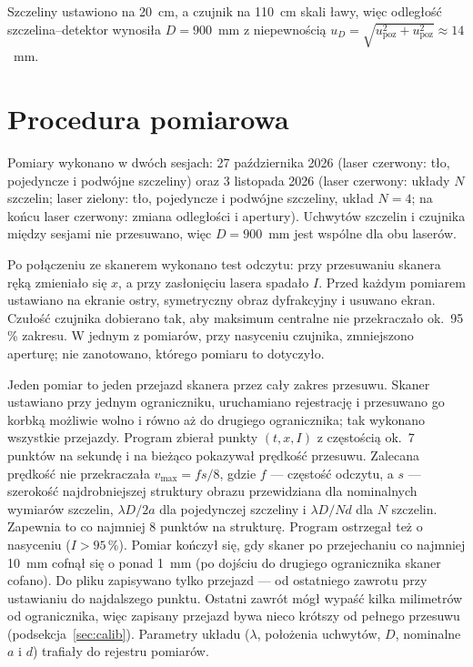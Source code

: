 \documentclass[12pt, a4paper]{article}
\begin{document}
Szczeliny ustawiono na 20~cm, a czujnik na 110~cm skali ławy, więc odległość
szczelina--detektor wynosiła $D = 900$~mm z niepewnością
$u_D = \sqrt{u_\text{poz}^2 + u_\text{poz}^2} \approx 14$~mm.

\section{Procedura pomiarowa}

Pomiary wykonano w dwóch sesjach: 27 października 2026 (laser czerwony: tło, pojedyncze
i podwójne szczeliny) oraz 3 listopada 2026 (laser czerwony: układy $N$ szczelin; laser
zielony: tło, pojedyncze i podwójne szczeliny, układ $N = 4$; na końcu laser czerwony:
zmiana odległości i apertury). Uchwytów szczelin i czujnika między sesjami nie przesuwano,
więc $D = 900$~mm jest wspólne dla obu laserów.

Po połączeniu ze skanerem wykonano test odczytu: przy przesuwaniu skanera ręką zmieniało się
$x$, a przy zasłonięciu lasera spadało $I$. Przed każdym pomiarem ustawiano na ekranie ostry,
symetryczny obraz dyfrakcyjny i usuwano ekran. Czułość czujnika dobierano tak, aby maksimum
centralne nie przekraczało ok.\ 95\,\% zakresu. W jednym z pomiarów, przy nasyceniu
czujnika, zmniejszono aperturę; nie zanotowano, którego pomiaru to dotyczyło.

Jeden pomiar to jeden przejazd skanera przez cały zakres przesuwu. Skaner ustawiano przy
jednym ograniczniku, uruchamiano rejestrację i przesuwano go korbką możliwie wolno i równo aż do
drugiego ogranicznika; tak wykonano wszystkie przejazdy.
Program zbierał punkty $(t, x, I)$ z częstością ok.\ 7 punktów na sekundę i na bieżąco
pokazywał prędkość przesuwu. Zalecana prędkość nie przekraczała $v_\text{max} = f s/8$,
gdzie $f$ --- częstość odczytu, a $s$ --- szerokość najdrobniejszej struktury obrazu
przewidziana dla nominalnych wymiarów szczelin, $\lambda D/2a$ dla pojedynczej szczeliny
i $\lambda D/Nd$ dla $N$ szczelin. Zapewnia to co najmniej 8 punktów na strukturę.
Program ostrzegał też o nasyceniu ($I > 95\,\%$). Pomiar kończył się, gdy skaner po
przejechaniu co najmniej 10~mm cofnął się o ponad 1~mm (po dojściu do drugiego ogranicznika
skaner cofano). Do pliku zapisywano tylko przejazd --- od ostatniego zawrotu przy ustawianiu
do najdalszego punktu. Ostatni zawrót mógł wypaść kilka milimetrów od ogranicznika, więc
zapisany przejazd bywa nieco krótszy od pełnego przesuwu (podsekcja~\ref{sec:calib}). Parametry układu
($\lambda$, położenia uchwytów, $D$, nominalne $a$ i $d$) trafiały do rejestru pomiarów.
\end{document}
